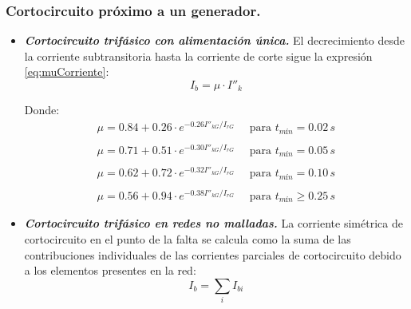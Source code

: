             \subsubsection{Cortocircuito próximo a un generador.}
                \begin{itemize}
                    \item \textbf{\textit{Cortocircuito trifásico con alimentación única.}}
                        El decrecimiento desde la corriente subtransitoria hasta la corriente de corte sigue la expresión \eqref{eq:muCorriente}:
                        \begin{equation}\label{eq:muCorriente}
                            I_\textit{b} = \mu\cdot I''_\textit{k}
                        \end{equation}

                        Donde:
                        \begin{equation}
                            \begin{matrix}
                            \mu = 0.84 + 0.26 \cdot e^{-0.26I''_\textit{kG}/I_\textit{rG}}\quad\text{ para }t_\textit{mín} = 0.02\,\textit{s}\\
                            \\
                            \mu = 0.71 + 0.51 \cdot e^{-0.30I''_\textit{kG}/I_\textit{rG}}\quad\text{ para }t_\textit{mín} = 0.05\,\textit{s}\\
                            \\
                            \mu = 0.62 + 0.72 \cdot e^{-0.32I''_\textit{kG}/I_\textit{rG}}\quad\text{ para }t_\textit{mín} = 0.10\,\textit{s}\\
                            \\
                            \mu = 0.56 + 0.94 \cdot e^{-0.38I''_\textit{kG}/I_\textit{rG}}\quad\text{ para }t_\textit{mín} \geq 0.25\,\textit{s}
                            \end{matrix}
                        \end{equation}

                    \item \textbf{\textit{Cortocircuito trifásico en redes no malladas.}}
                        La corriente simétrica de cortocircuito en el punto de la falta se calcula como la suma de las contribuciones individuales de las corrientes parciales de cortocircuito debido a los elementos presentes en la red:
                        \begin{equation}
                             I_\textit{b} = \sum_i I_{\textit{b}i}
                        \end{equation}


\end{itemize}
